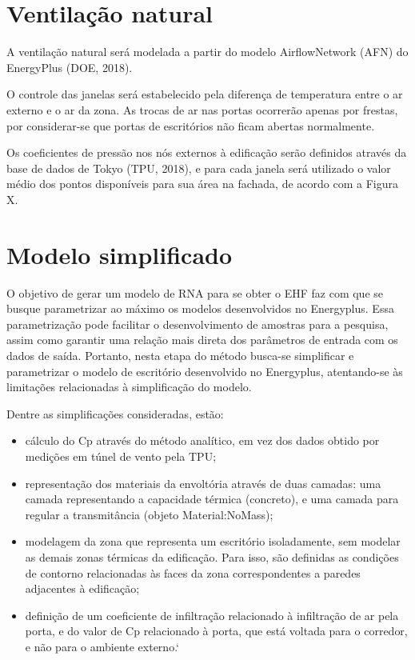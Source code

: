 \documentclass[brazil,hardcopy,openany,a5paper]{ufscthesis}
\begin{document}
		\section{Ventilação natural}
		
		A ventilação natural será modelada a partir do modelo AirflowNetwork (AFN) do EnergyPlus (DOE, 2018).
		
		O controle das janelas será estabelecido pela diferença de temperatura entre o ar externo e o ar da zona. As trocas de ar nas portas ocorrerão apenas por frestas, por considerar-se que portas de escritórios não ficam abertas normalmente.
		
		Os coeficientes de pressão nos nós externos à edificação serão definidos através da base de dados de Tokyo (TPU, 2018), e para cada janela será utilizado o valor médio dos pontos disponíveis para sua área na fachada, de acordo com a Figura X.
		
		\section{Modelo simplificado}
		
		O objetivo de gerar um modelo de RNA para se obter o EHF faz com que se busque parametrizar ao máximo os modelos desenvolvidos no Energyplus. Essa parametrização pode facilitar o desenvolvimento de amostras para a pesquisa, assim como garantir uma relação mais direta dos parâmetros de entrada com os dados de saída. Portanto, nesta etapa do método busca-se simplificar e parametrizar o modelo de escritório desenvolvido no Energyplus, atentando-se às limitações relacionadas à simplificação do modelo.
		
		Dentre as simplificações consideradas, estão:
		
		\begin{itemize}
		\item cálculo do Cp através do método analítico, em vez dos dados obtido por medições em túnel de vento pela TPU;
		\item representação dos materiais da envoltória através de duas camadas: uma camada representando a capacidade térmica (concreto), e uma camada para regular a transmitância (objeto Material:NoMass);
		\item modelagem da zona que representa um escritório isoladamente, sem modelar as demais zonas térmicas da edificação. Para isso, são definidas as condições de contorno relacionadas às faces da zona correspondentes a paredes adjacentes à edificação;
		\item definição de um coeficiente de infiltração relacionado à infiltração de ar pela porta, e do valor de Cp relacionado à porta, que está voltada para o corredor, e não para o ambiente externo.`
		\end{itemize}
		
\end{document}
